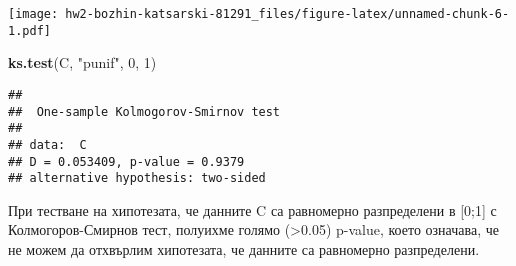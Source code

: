 \documentclass[]{article}
\newenvironment{Shaded}{\begin{snugshade}}{\end{snugshade}}
\newcommand{\KeywordTok}[1]{\textcolor[rgb]{0.13,0.29,0.53}{\textbf{#1}}}
\newcommand{\DecValTok}[1]{\textcolor[rgb]{0.00,0.00,0.81}{#1}}
\newcommand{\StringTok}[1]{\textcolor[rgb]{0.31,0.60,0.02}{#1}}
\newcommand{\NormalTok}[1]{#1}
\begin{document}
\texttt{[image: hw2-bozhin-katsarski-81291\_files/figure-latex/unnamed-chunk-6-1.pdf]}

\begin{Shaded}
\begin{Highlighting}[]
\KeywordTok{ks.test}\NormalTok{(C, }\StringTok{"punif"}\NormalTok{, }\DecValTok{0}\NormalTok{, }\DecValTok{1}\NormalTok{)}
\end{Highlighting}
\end{Shaded}

\begin{verbatim}
## 
##  One-sample Kolmogorov-Smirnov test
## 
## data:  C
## D = 0.053409, p-value = 0.9379
## alternative hypothesis: two-sided
\end{verbatim}

При тестване на хипотезата, че данните C са равномерно разпределени в
{[}0;1{]} с Колмогоров-Смирнов тест, полуихме голямо
(\textgreater{}0.05) p-value, което означава, че не можем да отхвърлим
хипотезата, че данните са равномерно разпределени.
\end{document}

